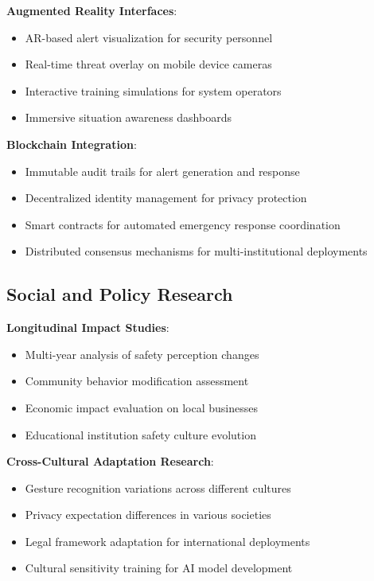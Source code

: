 \documentclass[12pt,a4paper]{article}
\begin{document}
\textbf{Augmented Reality Interfaces}:
\begin{itemize}
    \item AR-based alert visualization for security personnel
    \item Real-time threat overlay on mobile device cameras
    \item Interactive training simulations for system operators
    \item Immersive situation awareness dashboards
\end{itemize}

\textbf{Blockchain Integration}:
\begin{itemize}
    \item Immutable audit trails for alert generation and response
    \item Decentralized identity management for privacy protection
    \item Smart contracts for automated emergency response coordination
    \item Distributed consensus mechanisms for multi-institutional deployments
\end{itemize}

\subsection{Social and Policy Research}

\textbf{Longitudinal Impact Studies}:
\begin{itemize}
    \item Multi-year analysis of safety perception changes
    \item Community behavior modification assessment
    \item Economic impact evaluation on local businesses
    \item Educational institution safety culture evolution
\end{itemize}

\textbf{Cross-Cultural Adaptation Research}:
\begin{itemize}
    \item Gesture recognition variations across different cultures
    \item Privacy expectation differences in various societies
    \item Legal framework adaptation for international deployments
    \item Cultural sensitivity training for AI model development
\end{itemize}
\end{document}
